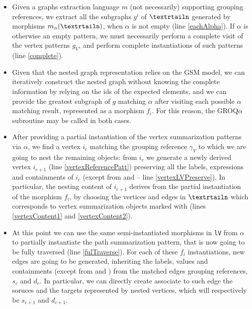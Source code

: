 \begin{algorithm}[!t]
\begin{adjustbox}{max width=\textwidth}
\begin{minipage}{1.2\linewidth}
\begin{algorithmic}[1]
			\end{algorithmic}
	\end{minipage}
	\end{adjustbox}
\end{algorithm}

\begin{itemize}
\item Given a graphs extraction language $m$ (not necessarily) supporting grouping references, we extract all the subgraphs $g^i$ of $\nested$ generated by morphisms $m_\alpha(\nested)$, when $\alpha$ is not empty (line \ref{eachAlpha}). If $\alpha$ is otherwise an empty pattern, we must necessarily perform a complete visit of the vertex patterns $g_V$, and perform complete instantiations of such patterns (line \ref{complete}). 
\item Given that the nested graph representation relies on the GSM model, we can iteratively construct the nested graph without knowing the complete information by relying on the ids of the expected elements, and we can provide the greatest subgraph of $g$ matching $\alpha$  after visiting  each possible $\alpha$ matching result, represented as a morphism $f_i$. For this reason, the GROQ$\alpha$ subroutine may be called in both cases.

\item After providing a partial instantiation of the vertex summarization patterns via $\alpha$, we find a vertex $i_c$ matching the grouping reference $\gamma_V$ to which we are going to nest the remaining objects: from $i_c$ we generate a newly derived vertex $i_{c+1}$ %
 (line \ref{vertexReferencePatt}) preserving all the labels, expressions and containments of $i_c$ (except from \RELA and \ONTA -- line \ref{vertexLVPreserve}). In particular, the nesting content of $i_{c+1}$ derives from the partial instantiation of the morphism $f_i$, by choosing the vertices and edges in $\nested$ which corresponds to vertex summarization objects marked with  (lines \ref{vertexContent1} and \ref{vertexContent2}).

\item At this point we can use the same semi-instantiated morphisms in \texttt{lV} from $\alpha$ to partially instantiate the path summarization pattern, that  is now going to be fully traversed (line \ref{fulTraverse}). For each of these $f_i$ instantiations, new edges are going to be generated, inheriting the labels, values and containments (except from \RELA and \ONTA) from the matched edges grouping references, $s_c$ and $d_c$. In particular, we can directly create associate to such edge the soruces and the targets represented by nested vertices, which will respectively be $s_{c+1}$ and $d_{c+1}$.


\end{itemize}
